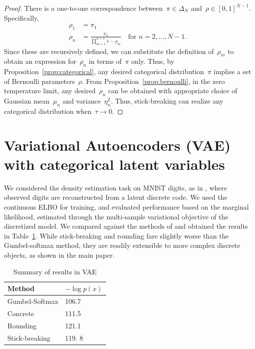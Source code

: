 \begin{proof}
  There is a one-to-one correspondence between~${\pi \in \Delta_N}$
  and~${\rho \in [0,1]^{N-1}}$.  Specifically,
  \begin{align*}
    \rho_1 &= \pi_1 \\
    \rho_n &= \frac{\pi_n}{\prod_{m=1}^{n=1} 1-\rho_m}
             \quad \text{for } n = 2, \ldots, N-1.
  \end{align*}
  Since these are recursively defined, we can substitute the definition
  of~$\rho_m$ to obtain an expression for~$\rho_n$ in terms of~$\pi$ only.
  Thus, by Proposition~\ref{prop:categorical}, any desired categorical
  distribution~$\pi$ implies a set of Bernoulli parameters~$\rho$.
  From Proposition~\ref{prop:bernoulli}, in the zero temperature limit,
  any desired~$\rho_n$ can be obtained with appropriate choice of
  Gaussian mean~$\mu_n$ and variance~$\eta_n^2$. Thus, stick-breaking
  can realize any categorical distribution when~${\tau \to 0}$.
\end{proof}


\section{Variational Autoencoders (VAE) with categorical latent variables}



We considered the density estimation task on MNIST digits, as in
\citet{maddison2016concrete, jang2016categorical}, where observed
digits are reconstructed from a latent discrete code. We used the
continuous ELBO for training, and evaluated performance based on the
marginal likelihood, estimated through the multi-sample variational
objective of the discretized model. We compared against the methods of
\cite{jang2016categorical, maddison2016concrete} and obtained the
results in Table~\ref{tab:vae}.  While stick-breaking and rounding
fare slightly worse than the Gumbel-softmax method, they are readily
extensible to more complex discrete objects, as shown in the main
paper.

\begin{table}[h]
  \caption{Summary of results in VAE}
  \label{tab:vae}
  \centering
  \begin{tabular}{ll}
    \textbf{Method} & $- \log p(x)$ \\
    \hline
    Gumbel-Softmax    & 106.7 \\
    Concrete  &  111.5\\
    Rounding &  121.1 \\
    Stick-breaking & 119. 8\\
    \bottomrule
  \end{tabular}
\end{table}


